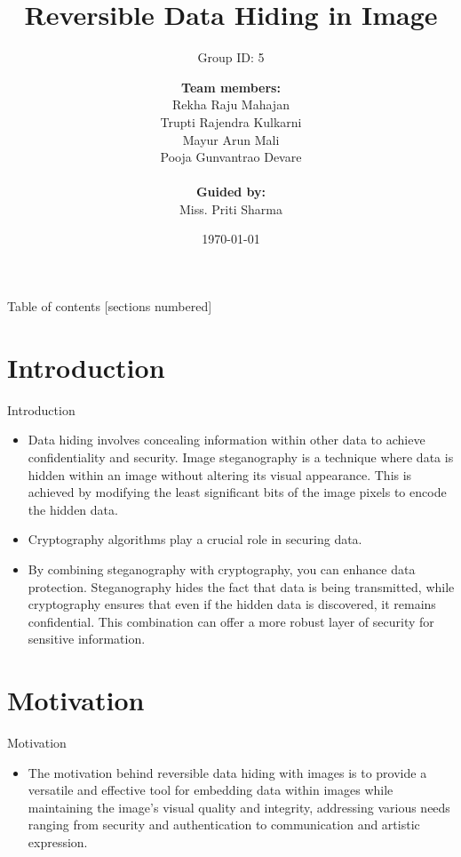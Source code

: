 \documentclass[10pt,xcolor=dvipsnames]{beamer}
\title{Reversible Data Hiding in Image}
\subtitle{Group ID: 5}
\date{\today}
\author{ \textbf{Team members:}\\Rekha Raju Mahajan\\Trupti Rajendra Kulkarni\\Mayur Arun Mali\\Pooja Gunvantrao Devare\\\\\textbf{Guided by:}\\Miss. Priti Sharma}
\begin{document}
\maketitle

\begin{frame}{Table of contents}
  [sections numbered]
  \tableofcontents%
\end{frame}

\section[Introduction]{Introduction}

\begin{frame}[fragile]{Introduction}
\begin{itemize}
    \item Data hiding involves concealing information within other data to achieve confidentiality and security. Image steganography is a technique where data is hidden within an image without altering its visual appearance. This is achieved by modifying the least significant bits of the image pixels to encode the hidden data.
    \item Cryptography algorithms play a crucial role in securing data.
    \item By combining steganography with cryptography, you can enhance data protection. Steganography hides the fact that data is being transmitted, while cryptography ensures that even if the hidden data is discovered, it remains confidential. This combination can offer a more robust layer of security for sensitive information.
\end{itemize}
  
\end{frame}

\section[Motivation]{Motivation}

\begin{frame}[fragile]{Motivation}
\begin{itemize}
    \item The motivation behind reversible data hiding with images is to provide a versatile and effective tool for embedding data within images while maintaining the image's visual quality and integrity, addressing various needs ranging from security and authentication to communication and artistic expression.
\end{itemize}

  
\end{frame}
\end{document}
